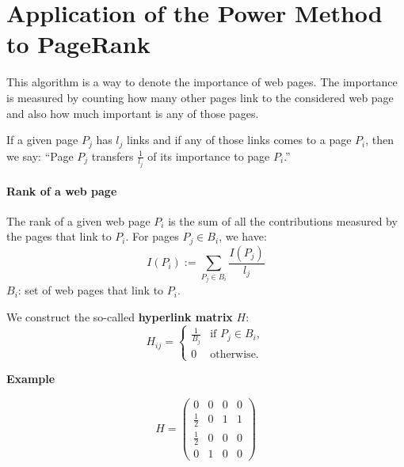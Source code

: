 \section{Application of the Power Method to PageRank}
This algorithm is a way to denote the importance of web pages. The importance is measured by counting how many other pages link to the considered web page and also how much important is any of those pages.

If a given page $P_j$ has $l_j$ links and if any of those links comes to a page $P_i$, then we say: ``Page $P_j$ transfers $\frac{1}{l_j}$ of its importance to page $P_i$.''

\paragraph{Rank of a web page}
The rank of a given web page $P_i$ is the sum of all the contributions measured by the pages that link to $P_i$. For pages $P_j \in B_i$, we have:
\begin{equation} \label{eq:rank}
    I(P_i) := \sum_{P_j \in B_i} \frac{I(P_j)}{l_j}
\end{equation}
$B_i$: set of web pages that link to $P_i$.

We construct the so-called \textbf{hyperlink matrix} $H$:
\[
H_{ij} = 
\begin{cases} 
\frac{1}{B_j} & \text{if } P_j \in B_i, \\
0 & \text{otherwise}.
\end{cases}
\]

\textbf{Example}
\begin{minipage}{0.5\textwidth}
\end{minipage}
\begin{minipage}{0.5\textwidth}
\[
H = 
    \begin{pmatrix}
    0 & 0 & 0 & 0 \\
    \frac{1}{2} & 0 & 1 & 1 \\
    \frac{1}{2} & 0 & 0 & 0 \\
    0 & 1 & 0 & 0
    \end{pmatrix}
\]
\end{minipage}

